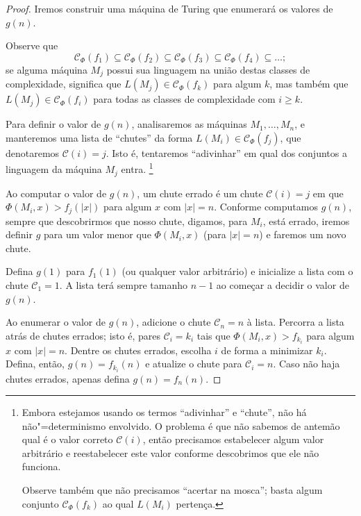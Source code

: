 \begin{proof}
    Iremos construir uma máquina de Turing
    que enumerará os valores de $g(n)$.

    Observe que
    \begin{equation*}
        \mathcal C_\Phi(f_1) \subseteq
        \mathcal C_\Phi(f_2) \subseteq
        \mathcal C_\Phi(f_3) \subseteq
        \mathcal C_\Phi(f_4) \subseteq
        \dots;
    \end{equation*}
    se alguma máquina $M_j$ possui sua linguagem
    na união destas classes de complexidade,
    significa que $L(M_j) \in \mathcal C_\Phi(f_k)$
    para algum $k$,
    mas também que $L(M_j) \in \mathcal C_\Phi(f_i)$
    para todas as classes de complexidade com $i \geq k$.

    Para definir o valor de $g(n)$,
    analisaremos as máquinas $M_1, \dots, M_n$,
    e manteremos uma lista de ``chutes''
    da forma $L(M_i) \in \mathcal C_\Phi(f_j)$,
    que denotaremos $\mathcal C(i) = j$.
    Isto é, tentaremos ``adivinhar''
    em qual dos conjuntos a linguagem da máquina $M_j$ entra.
    \footnote{
        Embora estejamos usando os termos
        ``adivinhar'' e ``chute'',
        não há não"=determinismo envolvido.
        O problema é que não sabemos de antemão
        qual é o valor correto $\mathcal C(i)$,
        então precisamos estabelecer algum valor arbitrário
        e reestabelecer este valor
        conforme descobrimos que ele não funciona.

        Observe também que não precisamos
        ``acertar na mosca'';
        basta algum conjunto $\mathcal C_\Phi(f_k)$
        ao qual $L(M_i)$ pertença.
    }

    Ao computar o valor de $g(n)$,
    um chute errado
    é um chute $\mathcal C(i) = j$
    em que $\Phi(M_i, x) > f_j(|x|)$
    para algum $x$ com $|x| = n$.
    Conforme computamos $g(n)$,
    sempre que descobrirmos que nosso chute,
    digamos, para $M_i$, está errado,
    iremos definir $g$ para um valor menor que $\Phi(M_i, x)$
    (para $|x| = n$)
    e faremos um novo chute.

    Defina $g(1)$ para $f_1(1)$
    (ou qualquer valor arbitrário)
    e inicialize a lista com o chute
    $\mathcal C_1 = 1$.
    A lista terá sempre tamanho $n-1$
    ao começar a decidir o valor de $g(n)$.

    Ao enumerar o valor de $g(n)$,
    adicione o chute $\mathcal C_n = n$ à lista.
    Percorra a lista atrás de chutes errados;
    isto é,
    pares $\mathcal C_i = k_i$
    tais que $\Phi(M_i, x) > f_{k_i}$
    para algum $x$ com $|x| = n$.
    Dentre os chutes errados,
    escolha $i$ de forma a minimizar $k_i$.
    Defina, então, $g(n) = f_{k_i}(n)$
    e atualize o chute para $\mathcal C_i = n$.
    Caso não haja chutes errados,
    apenas defina $g(n) = f_n(n)$.


\end{proof}
